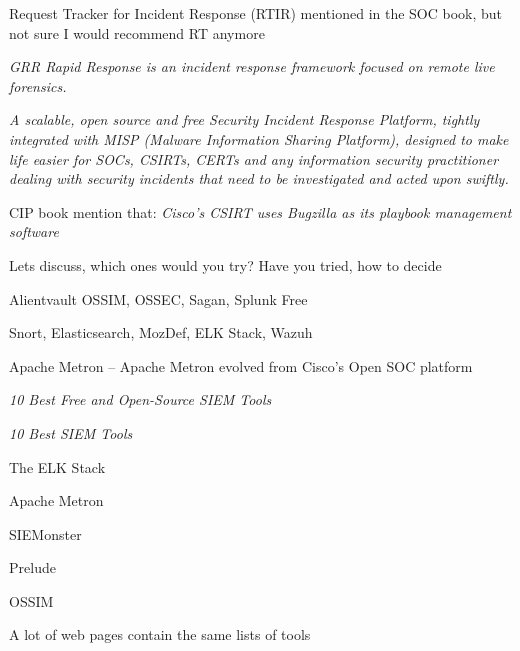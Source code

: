 \documentclass[Screen16to9,17pt]{foils}
\begin{document}
\begin{list2}
  \item {}

  \item Request Tracker for Incident Response (RTIR)  mentioned in the SOC book, but not sure I would recommend RT anymore

  \item \emph{GRR Rapid Response is an incident response framework focused on remote live forensics.}

  \item \emph{A scalable, open source and free Security Incident Response Platform, tightly integrated with MISP (Malware Information Sharing Platform), designed to make life easier for SOCs, CSIRTs, CERTs and any information security practitioner dealing with security incidents that need to be investigated and acted upon swiftly.} 

\item CIP book mention that: \emph{Cisco’s CSIRT uses Bugzilla as its playbook management 
software}

\end{list2}

\centerline{Lets discuss, which ones would you try? Have you tried, how to decide}


\begin{list2}
\item Alientvault OSSIM, OSSEC, Sagan, Splunk Free
\item Snort, Elasticsearch, MozDef, ELK Stack, Wazuh
\item Apache Metron -- Apache Metron evolved from Cisco’s Open SOC platform
\end{list2}

\emph{10 Best Free and Open-Source SIEM Tools} 

\emph{10 Best SIEM Tools} 




\begin{quote}

\end{quote}

\begin{list2}
\item The ELK Stack
\item Apache Metron
\item SIEMonster
\item Prelude
\item OSSIM
\end{list2}
A lot of web pages contain the same lists of tools
\end{document}
